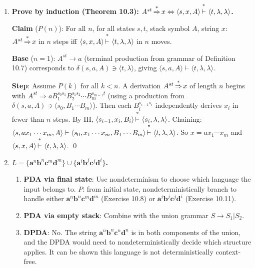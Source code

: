\begin{enumerate}[{10.}1. ]
The specific grammar for $P_3$ follows this schema with the particular transitions of $P_3$ filled in from Example 10.5.

\item \textbf{Prove by induction (Theorem 10.3): $A^{st}\DRightarrow x \Leftrightarrow \langle s,x,A\rangle\Dvdash\langle t,\lambda,\lambda\rangle$.}

\textbf{Claim} ($P(n)$): For all $n$, for all states $s,t$, stack symbol $A$, string $x$: $A^{st}\operatorname{\overset{*}{\Rightarrow}} x$ in $n$ steps iff $\langle s,x,A\rangle\Dvdash\langle t,\lambda,\lambda\rangle$ in $n$ moves.

\textbf{Base} ($n=1$): $A^{st} \to a$ (terminal production from grammar of Definition 10.7) corresponds to $\delta(s,a,A) \ni \langle t,\lambda\rangle$, giving $\langle s,a,A\rangle\vdash\langle t,\lambda,\lambda\rangle$. \checkmark

\textbf{Step}: Assume $P(k)$ for all $k < n$. A derivation $A^{st}\operatorname{\overset{*}{\Rightarrow}} x$ of length $n$ begins with $A^{st} \Rightarrow a B_1^{s_0 s_1} B_2^{s_1 s_2}\cdots B_m^{s_{m-1} t}$ (using a production from $\delta(s,a,A)\ni\langle s_0,B_1\cdots B_m\rangle$). Then each $B_i^{s_{i-1}s_i}$ independently derives $x_i$ in fewer than $n$ steps. By IH, $\langle s_{i-1},x_i,B_i\rangle\Dvdash\langle s_i,\lambda,\lambda\rangle$. Chaining: $\langle s,ax_1\cdots x_m,A\rangle\vdash\langle s_0,x_1\cdots x_m,B_1\cdots B_m\rangle\Dvdash\langle t,\lambda,\lambda\rangle$. So $x = ax_1\cdots x_m$ and $\langle s,x,A\rangle\Dvdash\langle t,\lambda,\lambda\rangle$. \qed

\item \textbf{$L=\{\pmb{a}^n\pmb{b}^n\pmb{c}^m\pmb{d}^m\}\cup\{\pmb{a}^i\pmb{b}^j\pmb{c}^j\pmb{d}^i\}$.}

\begin{enumerate}
\item \textbf{PDA via final state}: Use nondeterminism to choose which language the input belongs to.
$P$: from initial state, nondeterministically branch to handle either $\pmb{a}^n\pmb{b}^n\pmb{c}^m\pmb{d}^m$ (Exercise 10.8) or $\pmb{a}^i\pmb{b}^j\pmb{c}^j\pmb{d}^i$ (Exercise 10.11).

\item \textbf{PDA via empty stack}: Combine with the union grammar $S \to S_1 | S_2$.

\item \textbf{DPDA}: No. The string $\pmb{a}^n\pmb{b}^n\pmb{c}^n\pmb{d}^n$ is in both components of the union, and the DPDA would need to nondeterministically decide which structure applies. It can be shown this language is not deterministically context-free.


\end{enumerate}
\end{enumerate}
